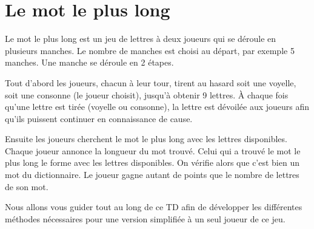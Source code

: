 \documentclass[a4paper,11pt]{style-esi/td}
\begin{document}


\section{Le mot le plus long}

	Le mot le plus long est un jeu de lettres à deux joueurs qui se déroule en
	plusieurs manches. Le nombre de manches est choisi au départ, par exemple 5 manches.
	Une manche se déroule en 2 étapes. 

	
	Tout d'abord les joueurs, chacun à leur tour, 
	tirent au hasard soit une voyelle, soit une consonne (le joueur choisit), 
	jusqu'à obtenir 9 lettres. À chaque fois qu'une lettre est tirée 
	(voyelle ou consonne), la lettre est dévoilée aux joueurs afin qu'ils puissent
	continuer en connaissance de cause.

	Ensuite les joueurs cherchent le mot le plus long avec les lettres disponibles.
	Chaque joueur annonce la longueur du mot trouvé. Celui qui a trouvé le mot le 
	plus long le forme avec les lettres disponibles. On vérifie alors que c'est 
	bien un mot du dictionnaire. Le joueur gagne autant de points que le nombre
	de lettres de son mot. 
			
	Nous allons vous guider tout au long de ce TD 
	afin de développer les différentes méthodes nécessaires 
	pour une version simplifiée à un seul joueur de ce jeu.
\end{document}
